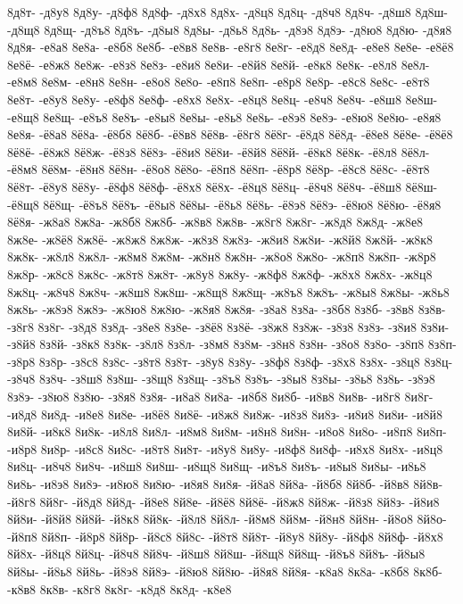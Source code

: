 {8д8т-
-д8у8
8д8у-
-д8ф8
8д8ф-
-д8х8
8д8х-
-д8ц8
8д8ц-
-д8ч8
8д8ч-
-д8ш8
8д8ш-
-д8щ8
8д8щ-
-д8ъ8
8д8ъ-
-д8ы8
8д8ы-
-д8ь8
8д8ь-
-д8э8
8д8э-
-д8ю8
8д8ю-
-д8я8
8д8я-
-е8а8
8е8а-
-е8б8
8е8б-
-е8в8
8е8в-
-е8г8
8е8г-
-е8д8
8е8д-
-е8е8
8е8е-
-е8ё8
8е8ё-
-е8ж8
8е8ж-
-е8з8
8е8з-
-е8и8
8е8и-
-е8й8
8е8й-
-е8к8
8е8к-
-е8л8
8е8л-
-е8м8
8е8м-
-е8н8
8е8н-
-е8о8
8е8о-
-е8п8
8е8п-
-е8р8
8е8р-
-е8с8
8е8с-
-е8т8
8е8т-
-е8у8
8е8у-
-е8ф8
8е8ф-
-е8х8
8е8х-
-е8ц8
8е8ц-
-е8ч8
8е8ч-
-е8ш8
8е8ш-
-е8щ8
8е8щ-
-е8ъ8
8е8ъ-
-е8ы8
8е8ы-
-е8ь8
8е8ь-
-е8э8
8е8э-
-е8ю8
8е8ю-
-е8я8
8е8я-
-ё8а8
8ё8а-
-ё8б8
8ё8б-
-ё8в8
8ё8в-
-ё8г8
8ё8г-
-ё8д8
8ё8д-
-ё8е8
8ё8е-
-ё8ё8
8ё8ё-
-ё8ж8
8ё8ж-
-ё8з8
8ё8з-
-ё8и8
8ё8и-
-ё8й8
8ё8й-
-ё8к8
8ё8к-
-ё8л8
8ё8л-
-ё8м8
8ё8м-
-ё8н8
8ё8н-
-ё8о8
8ё8о-
-ё8п8
8ё8п-
-ё8р8
8ё8р-
-ё8с8
8ё8с-
-ё8т8
8ё8т-
-ё8у8
8ё8у-
-ё8ф8
8ё8ф-
-ё8х8
8ё8х-
-ё8ц8
8ё8ц-
-ё8ч8
8ё8ч-
-ё8ш8
8ё8ш-
-ё8щ8
8ё8щ-
-ё8ъ8
8ё8ъ-
-ё8ы8
8ё8ы-
-ё8ь8
8ё8ь-
-ё8э8
8ё8э-
-ё8ю8
8ё8ю-
-ё8я8
8ё8я-
-ж8а8
8ж8а-
-ж8б8
8ж8б-
-ж8в8
8ж8в-
-ж8г8
8ж8г-
-ж8д8
8ж8д-
-ж8е8
8ж8е-
-ж8ё8
8ж8ё-
-ж8ж8
8ж8ж-
-ж8з8
8ж8з-
-ж8и8
8ж8и-
-ж8й8
8ж8й-
-ж8к8
8ж8к-
-ж8л8
8ж8л-
-ж8м8
8ж8м-
-ж8н8
8ж8н-
-ж8о8
8ж8о-
-ж8п8
8ж8п-
-ж8р8
8ж8р-
-ж8с8
8ж8с-
-ж8т8
8ж8т-
-ж8у8
8ж8у-
-ж8ф8
8ж8ф-
-ж8х8
8ж8х-
-ж8ц8
8ж8ц-
-ж8ч8
8ж8ч-
-ж8ш8
8ж8ш-
-ж8щ8
8ж8щ-
-ж8ъ8
8ж8ъ-
-ж8ы8
8ж8ы-
-ж8ь8
8ж8ь-
-ж8э8
8ж8э-
-ж8ю8
8ж8ю-
-ж8я8
8ж8я-
-з8а8
8з8а-
-з8б8
8з8б-
-з8в8
8з8в-
-з8г8
8з8г-
-з8д8
8з8д-
-з8е8
8з8е-
-з8ё8
8з8ё-
-з8ж8
8з8ж-
-з8з8
8з8з-
-з8и8
8з8и-
-з8й8
8з8й-
-з8к8
8з8к-
-з8л8
8з8л-
-з8м8
8з8м-
-з8н8
8з8н-
-з8о8
8з8о-
-з8п8
8з8п-
-з8р8
8з8р-
-з8с8
8з8с-
-з8т8
8з8т-
-з8у8
8з8у-
-з8ф8
8з8ф-
-з8х8
8з8х-
-з8ц8
8з8ц-
-з8ч8
8з8ч-
-з8ш8
8з8ш-
-з8щ8
8з8щ-
-з8ъ8
8з8ъ-
-з8ы8
8з8ы-
-з8ь8
8з8ь-
-з8э8
8з8э-
-з8ю8
8з8ю-
-з8я8
8з8я-
-и8а8
8и8а-
-и8б8
8и8б-
-и8в8
8и8в-
-и8г8
8и8г-
-и8д8
8и8д-
-и8е8
8и8е-
-и8ё8
8и8ё-
-и8ж8
8и8ж-
-и8з8
8и8з-
-и8и8
8и8и-
-и8й8
8и8й-
-и8к8
8и8к-
-и8л8
8и8л-
-и8м8
8и8м-
-и8н8
8и8н-
-и8о8
8и8о-
-и8п8
8и8п-
-и8р8
8и8р-
-и8с8
8и8с-
-и8т8
8и8т-
-и8у8
8и8у-
-и8ф8
8и8ф-
-и8х8
8и8х-
-и8ц8
8и8ц-
-и8ч8
8и8ч-
-и8ш8
8и8ш-
-и8щ8
8и8щ-
-и8ъ8
8и8ъ-
-и8ы8
8и8ы-
-и8ь8
8и8ь-
-и8э8
8и8э-
-и8ю8
8и8ю-
-и8я8
8и8я-
-й8а8
8й8а-
-й8б8
8й8б-
-й8в8
8й8в-
-й8г8
8й8г-
-й8д8
8й8д-
-й8е8
8й8е-
-й8ё8
8й8ё-
-й8ж8
8й8ж-
-й8з8
8й8з-
-й8и8
8й8и-
-й8й8
8й8й-
-й8к8
8й8к-
-й8л8
8й8л-
-й8м8
8й8м-
-й8н8
8й8н-
-й8о8
8й8о-
-й8п8
8й8п-
-й8р8
8й8р-
-й8с8
8й8с-
-й8т8
8й8т-
-й8у8
8й8у-
-й8ф8
8й8ф-
-й8х8
8й8х-
-й8ц8
8й8ц-
-й8ч8
8й8ч-
-й8ш8
8й8ш-
-й8щ8
8й8щ-
-й8ъ8
8й8ъ-
-й8ы8
8й8ы-
-й8ь8
8й8ь-
-й8э8
8й8э-
-й8ю8
8й8ю-
-й8я8
8й8я-
-к8а8
8к8а-
-к8б8
8к8б-
-к8в8
8к8в-
-к8г8
8к8г-
-к8д8
8к8д-
-к8е8
}
